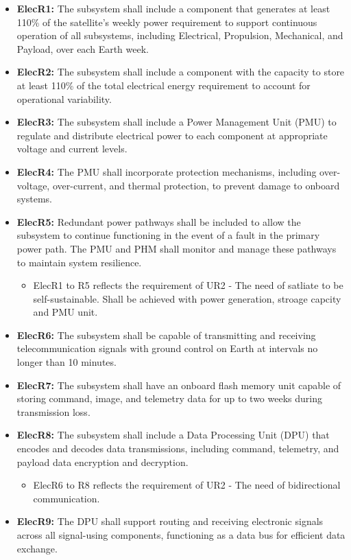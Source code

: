 \begin{itemize}

    \item \textbf{ElecR1:}
    The subsystem shall include a component that generates at least 110\% of the satellite’s weekly power requirement to support continuous operation of all subsystems, including Electrical, Propulsion, Mechanical, and Payload, over each Earth week.
    
    \item \textbf{ElecR2:}
    The subsystem shall include a component with the capacity to store at least 110\% of the total electrical energy requirement to account for operational variability. 

    \item \textbf{ElecR3:}
    The subsystem shall include a Power Management Unit (PMU) to regulate and distribute electrical power to each component at appropriate voltage and current levels. 

    \item \textbf{ElecR4:}
    The PMU shall incorporate protection mechanisms, including over-voltage, over-current, and thermal protection, to prevent damage to onboard systems. 
   
    \item \textbf{ElecR5:}
    Redundant power pathways shall be included to allow the subsystem to continue functioning in the event of a fault in the primary power path. The PMU and PHM shall monitor and manage these pathways to maintain system resilience.
    \begin{itemize}
        \item ElecR1 to R5 reflects the requirement of UR2 - The need of satliate to be self-sustainable. Shall be achieved with power generation, stroage capcity and PMU unit.
    \end{itemize}
    \item \textbf{ElecR6:}
    The subsystem shall be capable of transmitting and receiving telecommunication signals with ground control on Earth at intervals no longer than 10 minutes.

    \item \textbf{ElecR7:}
    The subsystem shall have an onboard flash memory unit capable of storing command, image, and telemetry data for up to two weeks during transmission loss.

    \item \textbf{ElecR8:}
    The subsystem shall include a Data Processing Unit (DPU) that encodes and decodes data transmissions, including command, telemetry, and payload data encryption and decryption.
     \begin{itemize}
        \item ElecR6 to R8 reflects the requirement of UR2 - The need of bidirectional communication. 
    \end{itemize}
    \item \textbf{ElecR9:}
    The DPU shall support routing and receiving electronic signals across all signal-using components, functioning as a data bus for efficient data exchange.


\end{itemize}
